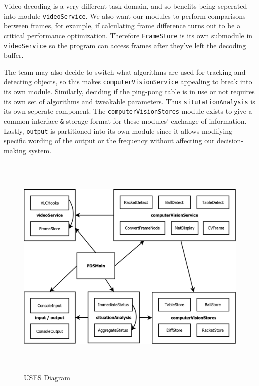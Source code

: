 \documentclass[11pt]{report}
\begin{document}
Video decoding is a very different task domain, and so benefits being seperated into module \texttt{videoService}.  We also want our modules to perform comparisons between frames, for example, if calculating frame difference turns out to be a critical performance optimization.  Therefore \texttt{FrameStore} is its own submodule in \texttt{videoService} so the program can access frames after they've left the decoding buffer.

The team may also decide to switch what algorithms are used for tracking and detecting objects, so this makes \texttt{computerVisionService} appealing to break into its own module.  Similarly, deciding if the ping-pong table is in use or not requires its own set of algorithms and tweakable parameters.  Thus \texttt{situtationAnalysis} is its own seperate component.  The \texttt{computerVisionStores} module exists to give a common interface \verb'&' storage format for these modules' exchange of information.  Lastly, \texttt{output} is partitioned into its own module since it allows modifying specific wording of the output or the frequency without affecting our decision-making system.

\begin{figure}[H]
\begin{center}
\includegraphics[width=1.05\textwidth,height=11cm,keepaspectratio]{Design-Uses.png}
\end{center}
\caption{\small{USES Diagram}}
\label{fig:uses}
\end{figure}
\end{document}
